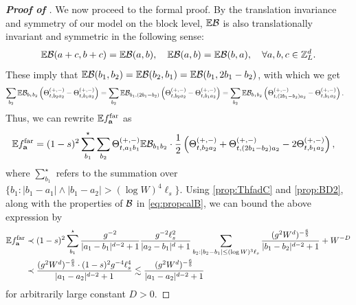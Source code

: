 \begin{proof}[\bf Proof of ]
We now proceed to the formal proof. 
By the translation invariance and symmetry of our model on the block level, $\E \cal B$ is also translationally invariant and symmetric in the following sense:
\[ \E \cal B(a+c,b+c)=\E\cal B(a,b),\quad \E \cal B(a,b)=\E\cal B(b,a),\quad \forall a,b,c\in \Zn.\]
These imply that \( \E	\cal B(b_1,b_2)=\E \cal B(b_2,b_1)=\E\cal B(b_1,2b_1-b_2)\), with which we get 
\begin{align*}
    \sum_{b_2} \E\cal B_{b_1b_2}\p{\Theta_{t,b_2a_2}^{(+,-)}-\Theta_{t,b_1a_2}^{(+,-)}}&=\sum_{b_2} \E \cal B_{b_1,(2b_1-b_2)}\p{\Theta_{t,b_2a_2}^{(+,-)}-\Theta_{t,b_1a_2}^{(+,-)}} =\sum_{b_2} \E \cal B_{b_1b_2}\p{\Theta_{t,(2b_1-b_2)a_2}^{(+,-)}-\Theta_{t,b_1a_2}^{(+,-)}}.
\end{align*}
Thus, we can rewrite $\E f_{\ba}^{\mathrm{far}}$ as 
\begin{align*}
\E	f_{\ba}^{\mathrm{far}}&=(1-s)^2\sum_{b_1}^\star \sum_{b_2} \Theta_{t,a_1b_1}^{(+,-)}\E\cal B_{b_1b_2}\cdot \frac 12 \p{\Theta_{t,b_2a_2}^{(+,-)}+\Theta_{t,(2b_1-b_2)a_2}^{(+,-)} -2\Theta_{t,b_1a_2}^{(+,-)}},
\end{align*}
where $\sum^\star_{b_1}$ refers to the summation over $\{b_1:|b_1-a_1|\wedge |b_1-a_2| > (\log W)^4\ell_s\}$. Using \eqref{prop:ThfadC} and \eqref{prop:BD2}, along with the properties of $\cal B$ in \eqref{eq:propcalB}, we can bound the above expression by 
\begin{align}
	\E	f_{\ba}^{\mathrm{far}} &\prec (1-s)^2\sum_{b_1}^\star \frac{\ilambda^{-2}}{|a_1-b_1|^{d-2}+1}\frac{\ilambda^{-2}\ell_s^2}{|a_2-b_1|^{d}+1}  \sum_{b_2:|b_2-b_1|\le (\log W)^3\ell_s} \frac{(\ilambda^{2}W^d)^{-\frac65}}{|b_1-b_2|^{d-2}+1} + W^{-D} \nonumber\\
	&\prec \frac{(\ilambda^{2}W^d)^{-\frac65}\cdot (1-s)^2\ilambda^{-4}\ell_s^4}{|a_1-a_2|^{d-2}+1} \lesssim \frac{(\ilambda^{2}W^d)^{-\frac65}}{|a_1-a_2|^{d-2}+1} \label{eq:boundEfar}
\end{align}
for arbitrarily large constant $D>0$.


\end{proof}
